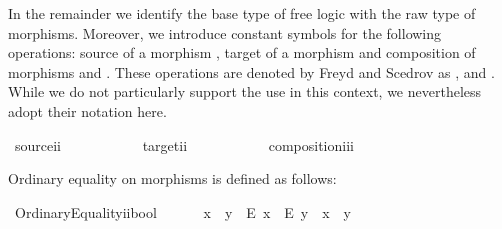 \begin{isabellebody}
\begin{isamarkuptext}
In the remainder we identify the base type  of free logic with the raw type of 
morphisms. Moreover, we introduce constant symbols for the following operations: 
source of a morphism , target of a morphism  and composition of morphisms
 and . These operations are denoted by Freyd and Scedrov as 
,  and . While we do not particularly support the use 
\isa{{\isasymbox}} in this context, we nevertheless adopt their notation here.%
\end{isamarkuptext}%
\isamarkuptrue%
\isamarkupfalse%
\ source{\isacharcolon}{\isacharcolon}{\isachardoublequoteopen}i{\isasymRightarrow}i{\isachardoublequoteclose}\ {\isacharparenleft}{\isachardoublequoteopen}{\isasymbox}{\isacharunderscore}{\isachardoublequoteclose}\ {\isacharbrackleft}{}{}{}{\isacharbrackright}\ {}{}{}{\isacharparenright}\ \isanewline
\ \ \ \ \ \ \ target{\isacharcolon}{\isacharcolon}{\isachardoublequoteopen}i{\isasymRightarrow}i{\isachardoublequoteclose}\ {\isacharparenleft}{\isachardoublequoteopen}{\isacharunderscore}{\isasymbox}{\isachardoublequoteclose}\ {\isacharbrackleft}{}{}{}{\isacharbrackright}\ {}{}{}{\isacharparenright}\ \isanewline
\ \ \ \ \ \ \ composition{\isacharcolon}{\isacharcolon}{\isachardoublequoteopen}i{\isasymRightarrow}i{\isasymRightarrow}i{\isachardoublequoteclose}\ {\isacharparenleft}\ {\isachardoublequoteopen}{\isasymcdot}{\isachardoublequoteclose}\ {}{}{}{\isacharparenright}%
\begin{isamarkuptext}%
Ordinary equality on morphisms is defined as follows:%
\end{isamarkuptext}%
\isamarkuptrue%
\isamarkupfalse%
\ OrdinaryEquality{\isacharcolon}{\isacharcolon}{\isachardoublequoteopen}i{\isasymRightarrow}i{\isasymRightarrow}bool{\isachardoublequoteclose}\ {\isacharparenleft}\ {\isachardoublequoteopen}{\isasymapprox}{\isachardoublequoteclose}\ {}{}{\isacharparenright}\ \isanewline
\ \ {\isachardoublequoteopen}x\ {\isasymapprox}\ y\ {\isasymequiv}\ {\isacharparenleft}{\isacharparenleft}\isactrlbold E\ x{\isacharparenright}\ \isactrlbold {\isasymleftrightarrow}\ {\isacharparenleft}\isactrlbold E\ y{\isacharparenright}{\isacharparenright}\ \isactrlbold {\isasymand}\ x\ \isactrlbold {\isacharequal}\ y{\isachardoublequoteclose}%

\end{isabellebody}
